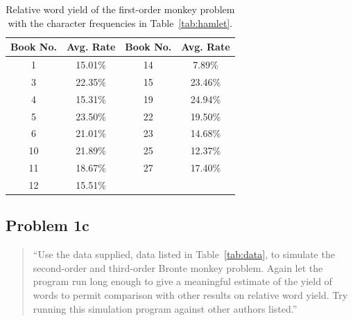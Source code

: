 \documentclass[conference]{IEEEtran}
\begin{document}
\begin{table}
\caption{Relative word yield of the first-order monkey problem \newline
with the character frequencies in Table~\ref{tab:hamlet}.\label{tab:problem1b}}
\vspace{-10pt}
\begin{center}
\begin{tabular}{cccc}
\hline
Book No. & Avg. Rate & Book No. & Avg. Rate \\
\hline
1  & 15.01\% & 14 & 7.89\% \\
3  & 22.35\% & 15 & 23.46\% \\
4  & 15.31\% & 19 & 24.94\% \\
5  & 23.50\% & 22 & 19.50\% \\
6  & 21.01\% & 23 & 14.68\% \\
10 & 21.89\% & 25 & 12.37\% \\
11 & 18.67\% & 27 & 17.40\% \\
12 & 15.51\% & & \\
\hline
\end{tabular}
\end{center}
\end{table}


\subsection{Problem 1c}
\label{sec:problem1c}

\begin{quote}
``Use the data supplied, data listed in Table~\ref{tab:data}, to simulate the 
second-order and third-order Bronte monkey problem. Again let the program run 
long enough to give a meaningful estimate of the yield of words to permit 
comparison with other results on relative word yield. Try running this 
simulation program against other authors listed.''
\end{quote}
\end{document}
